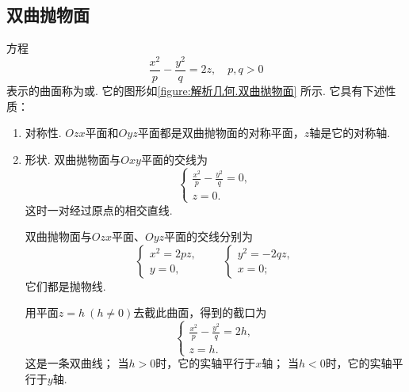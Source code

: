 \subsection{双曲抛物面}
方程\begin{equation}\label{equation:解析几何.双曲抛物面的一般方程}
	\frac{x^2}{p}-\frac{y^2}{q}=2z,
	\quad p,q>0
\end{equation}
表示的曲面称为或.
它的图形如\cref{figure:解析几何.双曲抛物面} 所示.
它具有下述性质：
\begin{enumerate}
	\item 对称性.
	\(Ozx\)平面和\(Oyz\)平面都是双曲抛物面的对称平面，\(z\)轴是它的对称轴.

	\item 形状.
	双曲抛物面与\(Oxy\)平面的交线为\begin{equation*}
		\left\{ \begin{array}{l}
			\frac{x^2}{p} - \frac{y^2}{q} = 0, \\
			z = 0.
		\end{array} \right.
	\end{equation*}
	这时一对经过原点的相交直线.

	双曲抛物面与\(Ozx\)平面、\(Oyz\)平面的交线分别为\begin{equation*}
		\left\{ \begin{array}{l}
			x^2 = 2pz, \\
			y = 0,
		\end{array} \right.
		\qquad
		\left\{ \begin{array}{l}
			y^2 = -2qz, \\
			x = 0;
		\end{array} \right.
	\end{equation*}
	它们都是抛物线.

	用平面\(z=h\ (h\neq0)\)去截此曲面，得到的截口为\begin{equation*}
		\left\{ \begin{array}{l}
			\frac{x^2}{p} - \frac{y^2}{q} = 2h, \\
			z = h.
		\end{array} \right.
	\end{equation*}
	这是一条双曲线；
	当\(h>0\)时，它的实轴平行于\(x\)轴；
	当\(h<0\)时，它的实轴平行于\(y\)轴.


\end{enumerate}
